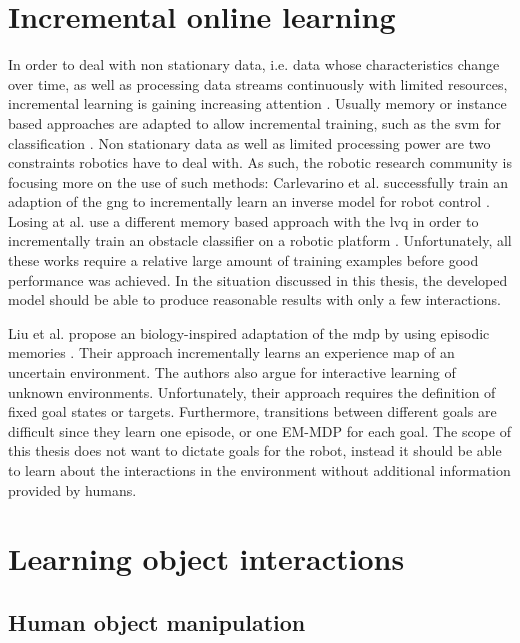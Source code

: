 \section{Incremental online learning}

In order to deal with non stationary data, i.e. data whose characteristics change over time, as well as processing data streams continuously with limited resources, incremental learning is gaining increasing attention \cite{polikar2014guest}. Usually memory or instance based approaches are adapted to allow incremental training, such as the \gls{svm} for classification \cite{diehl2003svm}. Non stationary data as well as limited processing power are two constraints robotics have to deal with. As such, the robotic research community is focusing more on the use of such methods: 
Carlevarino et al. successfully train an adaption of the \gls{gng} to incrementally learn an inverse model for robot control \cite{carlevarino2000incremental}. 
Losing at al. use a different memory based approach with the \gls{lvq} in order to incrementally train an obstacle classifier on a robotic platform \cite{losing2015interactive}.
Unfortunately, all these works require a relative large amount of training examples before good performance was achieved. In the situation discussed in this thesis, the developed model should be able to produce reasonable results with only a few interactions.

Liu et al. propose an biology-inspired adaptation of the \gls{mdp} by using episodic memories \cite{liu2015robotic, roboticEpisodes}. Their approach incrementally learns an experience map of an uncertain environment. 
The authors also argue for interactive learning of unknown environments. Unfortunately, their approach requires the definition of fixed goal states or targets. Furthermore, transitions between different goals are difficult since they learn one episode, or one EM-MDP for each goal. The scope of this thesis does not want to dictate goals for the robot, instead it should be able to learn about the interactions in the environment without additional information provided by humans.

\section{Learning object interactions}

\subsection{Human object manipulation}

